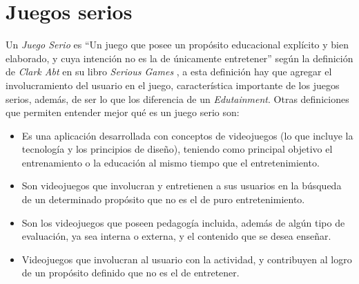 \chapter{Juegos serios}
\label{chap:juegos_serios}



Un \emph{Juego Serio} es \enquote{Un juego que posee un propósito 
educacional explícito y bien elaborado, y cuya intención no es la de únicamente 
entretener} según la definición de \emph{Clark Abt} en su libro \emph{Serious Games}
\cite{abt1987serious}, a esta definición hay que agregar el involucramiento del 
usuario en el juego, característica importante de los juegos serios, además, de ser 
lo que los diferencia de un \emph{Edutainment}\cite{resnick:2004,charsky:2010}. Otras 
definiciones que permiten entender mejor qué es un juego serio son:

\begin{itemize}
    \item Es una aplicación desarrollada con conceptos de videojuegos (lo que
        incluye la tecnología y los principios de diseño), teniendo como
        principal objetivo el entrenamiento o la educación al mismo tiempo que
        el entretenimiento\cite{ludus:sg}.
    \item Son videojuegos que involucran y entretienen a sus usuarios en la
        búsqueda de un determinado propósito que no es el de puro
        entretenimiento\cite{ludus:sg}.
    \item Son los videojuegos que poseen pedagogía incluida, además de algún tipo de
        evaluación, ya sea interna o externa, y el contenido que se desea
        enseñar\cite{damien:sg,sg:aoverview}.
        
    \item Videojuegos que involucran al usuario con la actividad, y contribuyen al logro de un propósito definido que no es el de entretener\cite{sg:aoverview}.
\end{itemize}

